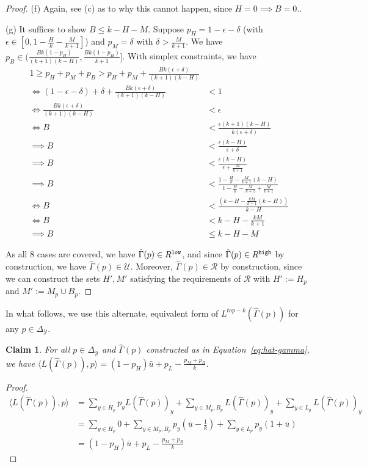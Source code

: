 \documentclass[12pt]{article}
\newcommand{\simplex}{\Delta_\Y}
\newcommand{\R}{\mathcal{R}}
\newcommand{\U}{\mathcal{U}}
\newcommand{\Y}{\mathcal{Y}}
\newcommand{\inprod}[2]{\langle #1, #2 \rangle}%
\newtheorem{claim}{Claim}
\begin{document}
\begin{proof}
	(f) Again, see (c) as to why this cannot happen, since $H = 0 \implies B = 0$..
	
	(g) It suffices to show $B \leq k - H - M$.
	Suppose $p_H = 1 - \epsilon - \delta$ (with $\epsilon \in [0,1 - \frac H k - \frac M {k+1}]$) and $p_M = \delta$ with $\delta > \frac M {k+1}$.
	We have $p_B \in (\frac{Bk(1-p_H)}{(k+1)(k-H)},\frac{Bk(1-p_H)}{k+1}]$.
	With simplex constraints, we have 
	\begin{align*}
	1 \geq p_H + p_M + p_B > p_H + p_M + \frac{Bk(\epsilon + \delta)}{(k+1)(k-H)}\\
	\iff (1 - \epsilon - \delta) + \delta + \frac{Bk(\epsilon + \delta)}{(k+1)(k-H)} &< 1\\
	\iff \frac{Bk(\epsilon + \delta)}{(k+1)(k-H)} &< \epsilon\\
	\iff B &< \frac{\epsilon (k+1)(k-H)}{k(\epsilon + \delta)}\\
	\implies B &< \frac{\epsilon (k-H)}{\epsilon + \delta}\\
	\implies B &< \frac{\epsilon (k-H)}{\epsilon + \frac M {k+1}}\\
	\implies B &< \frac{1- \frac H k - \frac M {k+1} (k-H)}{1- \frac H k - \frac M {k+1}+ \frac M {k+1}}\\
	\iff B &< \frac{(k- H - \frac {kM}{k+1} (k-H))}{k-H}\\
	\iff B &< k- H - \frac {kM}{k+1}\\
	\implies B &\leq k- H - M
	\end{align*}
	
	As all 8 cases are covered, we have $\hat \Gamma(p) \in R^{\tt low}$, and since $\hat \Gamma(p) \in R^{\tt high}$ by construction, we have $\hat \Gamma(p) \in \U$.
	Moreover, $\hat \Gamma(p) \in \R$ by construction, since we can construct the sets $H', M'$ satisfying the requirements of $\R$ with $H' := H_p$ and $M' := M_p \cup B_p$. 
\end{proof}

In what follows, we use this alternate, equivalent form of $L^{top-k}(\hat \Gamma(p))$ for any $p \in \simplex$.
\begin{claim}
	For all $p \in \simplex$ and $\hat \Gamma(p)$ constructed as in Equation~\eqref{eq:hat-gamma}, we have $\inprod{L(\hat \Gamma(p))}{p} = (1-p_H) \bar u + p_L - \frac{p_M + p_B}{k}$. 
\end{claim}
\begin{proof}
	\begin{align*}
	\inprod{L(\hat \Gamma(p))}{p} &=
	\sum_{y \in H_p} p_y L(\hat \Gamma(p))_y + \sum_{y \in M_p, B_p} L(\hat \Gamma(p))_y + \sum_{y \in L_p}L(\hat \Gamma(p))_y \\
	&= \sum_{y \in H_p} 0 + \sum_{y \in M_p, B_p} p_y(\bar u - \frac{1}{k}) + \sum_{y \in L_p} p_y(1 + \bar u) \\
	&= (1-p_H) \bar u + p_L - \frac{p_M + p_B}{k}
	\end{align*}
\end{proof}
\end{document}
